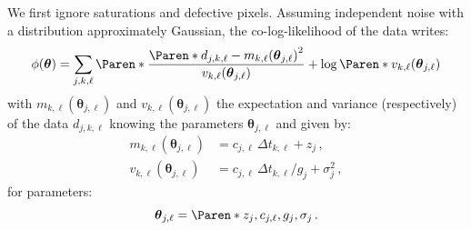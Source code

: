 \documentclass[a4paper,11pt,twoside]{scrartcl}
\newcommand{\oops}[1]{\textcolor[named]{BrickRed}{#1}}
\newcommand*{\Tag}[1]{\mathsf{#1}}
\newcommand*{\estim}[1]{\widehat{#1}}
\newcommand*{\V}[1]{\boldsymbol{#1}}   %
\theoremstyle{plain} %
\theoremstyle{definition}
\theoremstyle{remark}
\begin{document}
%

We first ignore saturations and defective pixels. Assuming independent noise
with a distribution approximately Gaussian, the co-log-likelihood of the data
writes:
\begin{equation}
  \phi(\V\theta) = \sum_{j,k,\ell}\Paren*{
    \frac{\Paren*{d_{j,k,\ell} -
        m_{k,\ell}(\V\theta_{j,\ell})}^2}{v_{k,\ell}(\V\theta_{j,\ell})}
    + \log\Paren*{v_{k,\ell}(\V\theta_{j,\ell})}
  }
\end{equation}
with $m_{k,\ell}(\V\theta_{j,\ell})$ and $v_{k,\ell}(\V\theta_{j,\ell})$ the
expectation and variance (respectively) of the data $d_{j,k,\ell}$ knowing the
parameters $\V\theta_{j,\ell}$ and given by:
\begin{align}
  m_{k,\ell}(\V\theta_{j,\ell})
  &= c_{j,\ell}\,\Delta t_{k,\ell} + z_j \, ,
  \\
  v_{k,\ell}(\V\theta_{j,\ell})
  &= c_{j,\ell}\,\Delta t_{k,\ell}/g_j + \sigma_j^2 \, ,
\end{align}
for parameters:
\begin{equation}
  \V\theta_{j,\ell} = \Paren*{z_j, c_{j,\ell}, g_j, \sigma_j} \, .
\end{equation}
\end{document}
